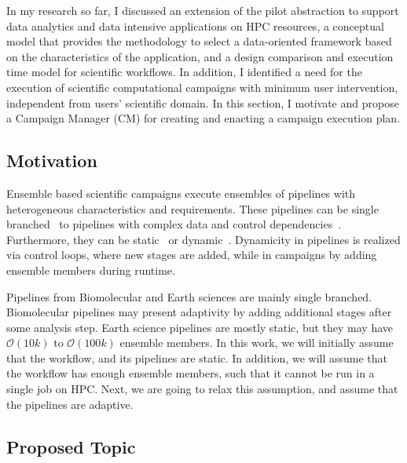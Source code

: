 \label{research}
In my research so far, I discussed an extension of the pilot abstraction to support data analytics and data intensive applications on HPC resources, a conceptual model that provides the methodology to select a data-oriented framework based on the characteristics of the application, and a design comparison and execution time model for scientific workflows.
In addition, I identified a need for the execution of scientific computational campaigns with minimum user intervention, independent from users' scientific domain.
In this section, I motivate and propose a Campaign Manager (CM) for creating and enacting a campaign execution plan.

\subsection{Motivation}
Ensemble based scientific campaigns execute ensembles of pipelines with 
heterogeneous characteristics and requirements. These pipelines can be single 
branched~\cite{paraskevakos2019workflow,dakka2018high,ramakrishnan_survey,
balasubramanian2018harnessing} to pipelines with complex data and control 
dependencies~\cite{ramakrishnan_survey,deelman2018future}. Furthermore, they 
can be static~\cite{paraskevakos2019workflow} or dynamic~\cite{dakka2018high,
balasubramanian2018harnessing}. Dynamicity in pipelines is realized via 
control loops, where new stages are added, while in campaigns by adding 
ensemble members during runtime.

Pipelines from Biomolecular and Earth sciences are mainly single branched. 
Biomolecular pipelines may present adaptivity by adding additional stages 
after some analysis step. Earth science pipelines are mostly static, but they 
may have $\mathcal{O}(10k)$ to $\mathcal{O}(100k)$ ensemble members. In this 
work, we will initially assume that the workflow, and its pipelines are 
static. In addition, we will assume that the workflow has enough ensemble 
members, such that it cannot be run in a single job on HPC. Next, we are 
going to relax this assumption, and assume that the pipelines are adaptive.


\subsection{Proposed Topic}
%
%

